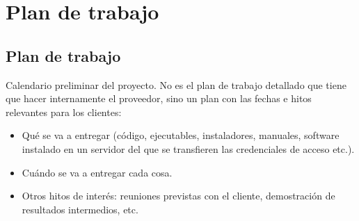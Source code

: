 
\chapter{Plan de trabajo} %

\label{Chapter4} %


\section{Plan de trabajo}

Calendario preliminar del proyecto. No es el plan de trabajo detallado que tiene que hacer internamente el proveedor, sino un plan con las fechas e hitos relevantes para los clientes:

\begin{itemize}
	\item Qué se va a entregar (código, ejecutables, instaladores, manuales, software instalado en un servidor del que se transfieren las credenciales de acceso etc.).
	\item Cuándo se va a entregar cada cosa.
	\item Otros hitos de interés: reuniones previstas con el cliente, demostración de resultados intermedios, etc.
\end{itemize}
